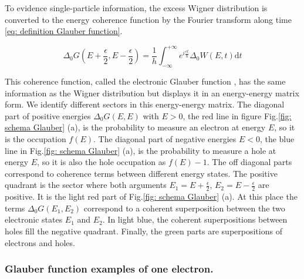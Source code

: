 To evidence single-particle information, the excess Wigner distribution is converted to the energy coherence function by the Fourier transform along time \eqref{eq: definition Glauber function}.

\begin{equation}
\Delta_{0}G\left(E+\frac{\epsilon}{2},E-\frac{\epsilon}{2}\right) = \frac{1}{h}\int_{-\infty}^{+\infty} e^{i\frac{\epsilon t}{\hbar}}\Delta_{0}W\left(E,t\right) \mathrm{d}t \label{eq: definition Glauber function}
\end{equation}

This coherence function, called the electronic Glauber function \cite{grenier2011electron,haack2013glauber}, has the same information as the Wigner distribution but displays it in an energy-energy matrix form.
We identify different sectors in this energy-energy matrix.
The diagonal part of positive energies $\Delta_{0}G(E,E)$ with $E>0$, the red line in figure Fig.\ref{fig: schema Glauber} (a), is the probability to measure an electron at energy $E$, so it is the occupation $f(E)$.
The diagonal part of negative energies $E<0$, the blue line in Fig.\ref{fig: schema Glauber} (a), is the probability to measure a hole at energy $E$, so it is also the hole occupation as $f(E)-1$.
The off diagonal parts correspond to coherence terms between different energy states.
The positive quadrant is the sector where both arguments $E_1 = E+\frac{\epsilon}{2}$, $E_2 = E-\frac{\epsilon}{2}$ are positive.
It is the light red part of Fig.\ref{fig: schema Glauber} (a).
At this place the terms $\Delta_{0}G(E_1,E_2)$ correspond to a coherent superposition between the two electronic states $E_1$ and $E_2$.
In light blue, the coherent superpositions between holes fill the negative quadrant.
Finally, the green parts are superpositions of electrons and holes.

\subsubsection*{Glauber function examples of one electron.}

